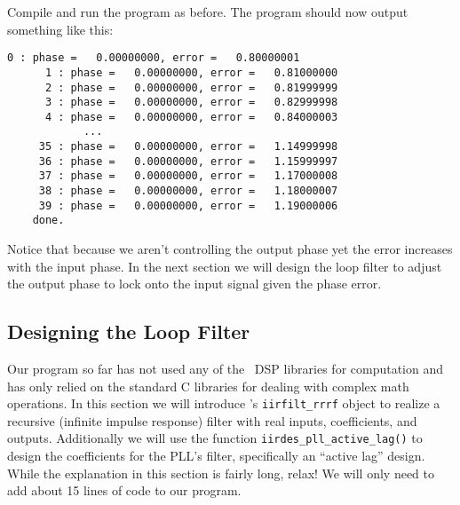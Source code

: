 %
Compile and run the program as before.
The program should now output something like this:
%
\begin{Verbatim}[fontsize=\small]
      0 : phase =   0.00000000, error =   0.80000001
      1 : phase =   0.00000000, error =   0.81000000
      2 : phase =   0.00000000, error =   0.81999999
      3 : phase =   0.00000000, error =   0.82999998
      4 : phase =   0.00000000, error =   0.84000003
            ...
     35 : phase =   0.00000000, error =   1.14999998
     36 : phase =   0.00000000, error =   1.15999997
     37 : phase =   0.00000000, error =   1.17000008
     38 : phase =   0.00000000, error =   1.18000007
     39 : phase =   0.00000000, error =   1.19000006
    done.
\end{Verbatim}
%
Notice that because we aren't controlling the output phase yet
the error increases with the input phase.
In the next section we will design the loop filter to adjust the output
phase to lock onto the input signal given the phase error.

\subsection{Designing the Loop Filter}
\label{tutorial:pll:design}

Our program so far has not used any of the \liquid\ DSP libraries for
computation and has only relied on the standard C libraries for dealing
with complex math operations.
In this section we will introduce \liquid's {\tt iirfilt\_rrrf} object
to realize a recursive (infinite impulse response) filter with real
inputs, coefficients, and outputs.
Additionally we will use the function {\tt iirdes\_pll\_active\_lag()}
to design the coefficients for the PLL's filter,
specifically an ``active lag'' design.
While the explanation in this section is fairly long, relax!
We will only need to add about 15 lines of code to our program.

